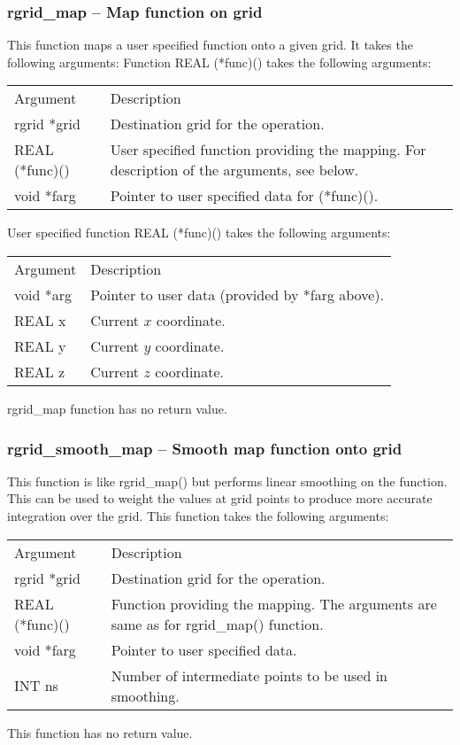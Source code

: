\documentclass[12pt,letterpaper]{article}
\begin{document}
\subsubsection{rgrid\_map -- Map function on grid}

This function maps a user specified function onto a given grid. It takes the following arguments:
Function REAL (*func)() takes the following arguments:\\
\begin{longtable}{p{} p{}}
Argument & Description\\
\cline{1-2}
rgrid *grid & Destination grid for the operation.\\
REAL (*func)() & User specified function providing the mapping. For description of the arguments, see below.\\
void *farg & Pointer to user specified data for (*func)().\\
\end{longtable}
User specified function REAL (*func)() takes the following arguments:
\begin{longtable}{p{} p{}}
Argument & Description\\
\cline{1-2}
void *arg & Pointer to user data (provided by *farg above).\\
REAL x & Current $x$ coordinate.\\
REAL y & Current $y$ coordinate.\\
REAL z & Current $z$ coordinate.\\
\end{longtable}
\noindent
rgrid\_map function has no return value.

\subsubsection{rgrid\_smooth\_map -- Smooth map function onto grid}

This function is like rgrid\_map() but performs linear smoothing on the function. This can be used to weight the values at grid points to produce more accurate integration over the grid. This function takes the following arguments:
\begin{longtable}{p{} p{}}
Argument & Description\\
\cline{1-2}
rgrid *grid & Destination grid for the operation.\\
REAL (*func)() & Function providing the mapping. The arguments are same as for rgrid\_map() function.\\
void *farg & Pointer to user specified data.\\
INT ns & Number of intermediate points to be used in smoothing.\\
\end{longtable}
\noindent
This function has no return value.
\end{document}
